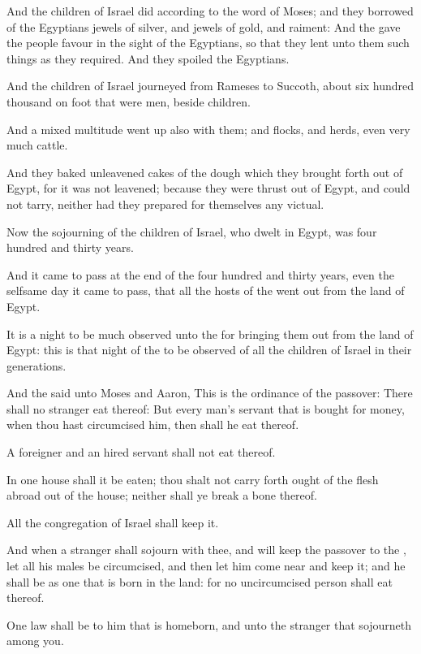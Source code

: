 \Verse And the children of Israel did according to the word of Moses; and they borrowed of the Egyptians jewels of silver, and jewels of gold, and raiment: \Verse And the \LORD gave the people favour in the sight of the Egyptians, so that they lent unto them such things as they required. And they spoiled the Egyptians.

\Verse And the children of Israel journeyed from Rameses to Succoth, about six hundred thousand on foot that were men, beside children.

\Verse And a mixed multitude went up also with them; and flocks, and herds, even very much cattle.

\Verse And they baked unleavened cakes of the dough which they brought forth out of Egypt, for it was not leavened; because they were thrust out of Egypt, and could not tarry, neither had they prepared for themselves any victual.

\Verse Now the sojourning of the children of Israel, who dwelt in Egypt, was four hundred and thirty years.

\Verse And it came to pass at the end of the four hundred and thirty years, even the selfsame day it came to pass, that all the hosts of the \LORD went out from the land of Egypt.

\Verse It is a night to be much observed unto the \LORD for bringing them out from the land of Egypt: this is that night of the \LORD to be observed of all the children of Israel in their generations.

\Verse And the \LORD said unto Moses and Aaron, This is the ordinance of the passover: There shall no stranger eat thereof: \Verse But every man's servant that is bought for money, when thou hast circumcised him, then shall he eat thereof.

\Verse A foreigner and an hired servant shall not eat thereof.

\Verse In one house shall it be eaten; thou shalt not carry forth ought of the flesh abroad out of the house; neither shall ye break a bone thereof.

\Verse All the congregation of Israel shall keep it.

\Verse And when a stranger shall sojourn with thee, and will keep the passover to the \LORD, let all his males be circumcised, and then let him come near and keep it; and he shall be as one that is born in the land: for no uncircumcised person shall eat thereof.

\Verse One law shall be to him that is homeborn, and unto the stranger that sojourneth among you.

